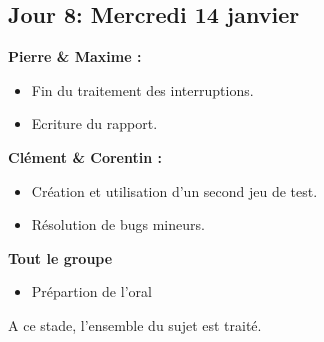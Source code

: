 \documentclass[11pt]{article} %
\begin{document}
\subsection{Jour 8: Mercredi 14 janvier}
\textbf{Pierre \& Maxime :}
\begin{itemize}
  \item Fin du traitement des interruptions.
  \item Ecriture du rapport.
\end{itemize}
\textbf{Cl\'ement \& Corentin :}
\begin{itemize}
  \item Création et utilisation d'un second jeu de test.
  \item Résolution de bugs mineurs.
\end{itemize}
\textbf{Tout le groupe}
\begin{itemize}
  \item Prépartion de l'oral
\end{itemize}
A ce stade, l'ensemble du sujet est traité.
\end{document}
